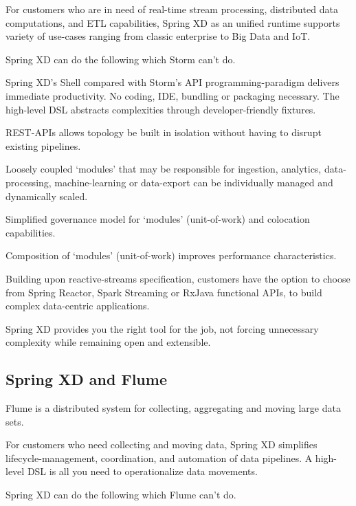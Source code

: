 For customers who are in need of real-time stream processing, distributed data computations, and ETL capabilities, Spring XD as an unified runtime supports variety of use-cases ranging from classic enterprise to Big Data and IoT. 

Spring XD can do the following which Storm can't do.

\begin{itemize*}
\item Spring XD's Shell compared with Storm's API programming-paradigm delivers immediate productivity. No coding, IDE, bundling or packaging necessary. The high-level DSL abstracts complexities through developer-friendly fixtures.
\item REST-APIs allows topology be built in isolation without having to disrupt existing pipelines.
\item Loosely coupled `modules' that may be responsible for ingestion, analytics, data-processing, machine-learning or data-export can be individually managed and dynamically scaled.
\item Simplified governance model for `modules' (unit-of-work) and colocation capabilities.
\item Composition of `modules' (unit-of-work) improves performance characteristics. 
\item Building upon reactive-streams specification, customers have the option to choose from Spring Reactor, Spark Streaming or RxJava functional APIs, to build complex data-centric applications.
\end{itemize*}

Spring XD provides you the right tool for the job, not forcing unnecessary complexity while remaining open and extensible.

\subsection{Spring XD and Flume}
Flume is a distributed system for collecting, aggregating and moving large data sets. 

For customers who need collecting and moving data, Spring XD simplifies lifecycle-management, coordination, and automation of data pipelines. A high-level DSL is all you need to operationalize data movements. 

Spring XD can do the following which Flume can't do.

